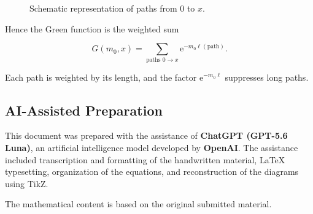 \documentclass[12pt,a4paper]{article}
\newcommand{\ee}{\mathrm{e}}
\begin{document}
\begin{figure}[h!]
\centering


\caption{Schematic representation of paths from $0$ to $x$.}
\end{figure}

Hence the Green function is the weighted sum

\begin{equation}
    G(m_0,x)
    =
    \sum_{\text{paths }0\to x}
    \ee^{-m_0\ell(\text{path})}.
\end{equation}

Each path is weighted by its length, and the factor
$\ee^{-m_0\ell}$ suppresses long paths.


\subsection*{AI-Assisted Preparation}

This document was prepared with the assistance of
\textbf{ChatGPT (GPT-5.6 Luna)}, an artificial intelligence model
developed by \textbf{OpenAI}. The assistance included
transcription and formatting of the handwritten material,
LaTeX typesetting, organization of the equations, and
reconstruction of the diagrams using TikZ.

The mathematical content is based on the original submitted
material.
\end{document}
